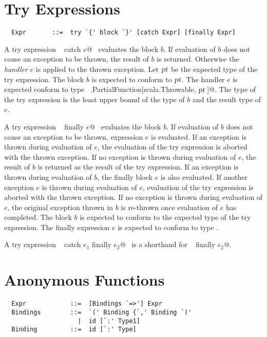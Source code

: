\documentclass[a4paper,12pt,twoside,titlepage]{book}
\newcommand{\proto}{\mbox{\sl pt}}
\begin{document}
\section{Try Expressions}

\syntax\begin{lstlisting}
  Expr       ::=  try `{' block `}' [catch Expr] [finally Expr]
\end{lstlisting}

A try expression ~ catch $e$@~ evaluates the block
$b$.  If evaluation of $b$ does not cause an exception to be
thrown, the result of $b$ is returned. Otherwise the {\em
handler} $e$ is applied to the thrown exception.  Let $\proto$
be the expected type of the try expression.  The block $b$ is
expected to conform to $\proto$.  The handler $e$ is expected
conform to type ~\lstinline@scala.PartialFunction[scala.Throwable, $\proto\,$]@.
The type of the try expression is the least upper bound of the type of
$b$ and the result type of $e$.

A try expression ~ finally $e$@~ evaluates the block
$b$.  If evaluation of $b$ does not cause an exception to be
thrown, expression $e$ is evaluated. If an exception is thrown
during evaluation of $e$, the evaluation of the try expression is
aborted with the thrown exception. If no exception is thrown during
evaluation of $e$, the result of $b$ is returned as the
result of the try expression. If an exception is thrown during
evaluation of $b$, the finally block
$e$ is also evaluated. If another exception $e$ is thrown
during evaluation of $e$, evaluation of the try expression is
aborted with the thrown exception. If no exception is thrown during
evaluation of $e$, the original exception thrown in $b$ is
re-thrown once evaluation of $e$ has completed.  The block
$b$ is expected to conform to the expected type of the try
expression. The finally expression $e$ is expected to conform to
type .

A try expression ~ catch $e_1$ finally $e_2$@~ is a shorthand
for  ~ finally $e_2$@.

\section{Anonymous Functions}
\label{sec:closures}

\syntax\begin{lstlisting}
  Expr            ::=  [Bindings `=>'] Expr
  Bindings        ::=  `(' Binding {`,' Binding `)'
                    |  id [`:' Type1]
  Binding         ::=  id [`:' Type]
\end{lstlisting}
\end{document}
